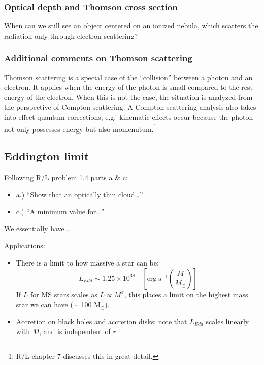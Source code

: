 \documentclass[12pt]{article}
\newcommand{\mar}[1]{\hspace{0pt}\marginpar{-\textcolor{black}{#1}-}}
\begin{document}
\subsubsection{Optical depth and Thomson cross section}
\mar{55}When can we still see an object centered on an ionized nebula, which
scatters the radiation only through electron scattering?

\subsubsection{Additional comments on Thomson scattering}
\mar{56}Thomson scattering is a special case of the ``collision'' between
a photon and an electron. It applies when the energy of the photon is
small compared to the rest energy of the electron. When this is not the
case, the situation is analyzed from the perspective of Compton scattering.
A Compton scattering analysis also takes into effect quantum corrections,
e.g.\ kinematic effects occur because the photon not only possesses energy
but also momenutum.\footnote{R/L chapter 7 discusses this in great detail.}

\subsection{Eddington limit}
\mar{57}Following R/L problem 1.4 parts a \& c:
\begin{itemize}[label={}]
    \item a.) ``Show that an optically thin cloud\ldots''
    \item c.) ``A minimum value for\ldots''
\end{itemize}

\mar{58}

\mar{59}We essentially have\ldots

\underline{Applications}:
\begin{itemize}
    \item There is a limit to how massive a star can be:
        \[
            L_{Edd} \sim 1.25 \times 10^{38} \quad
            \left[
                \mathrm{erg}\;\mathrm{s}^{-1} \left( \frac{M}{M_{\odot}} \right)
                \right]
            \]
        If $L$ for MS stars scales as $ L \propto M^{x} $, this places a limit
        on the highest mass star we can have ($\sim$ 100 M$_{\odot}$).
    \item Accretion on black holes and accretion disks: note that $L_{Edd}$
        scales linearly with $M$, and is independent of $r$
\end{itemize}
\end{document}
